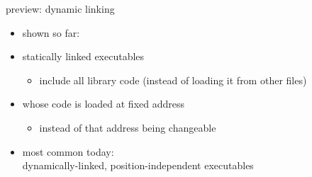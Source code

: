 \begin{frame}{preview: dynamic linking}
    \begin{itemize}
    \item shown so far:
    \item statically linked executables
        \begin{itemize}
        \item include all library code (instead of loading it from other files)
        \end{itemize}
    \item whose code is loaded at fixed address
        \begin{itemize}
        \item instead of that address being changeable
        \end{itemize}
    \vspace{.5cm}
    \item most common today: \\dynamically-linked, position-independent executables
    \end{itemize}
\end{frame}
